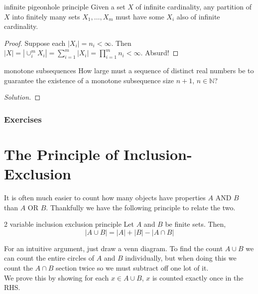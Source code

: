 \documentclass{article}
\newcounter{statementcount}
\begin{document}
\begin{theorem}[]{infinite pigeonhole principle}
    Given a set $X$ of infinite cardinality, any partition of $X$ into finitely many sets $X_1, \dots, X_m$ must have some $X_i$ also of infinite 
    cardinality. 
\end{theorem}

\begin{proof}
    Suppose each $|X_i| = n_i < \infty$. Then $|X| = |\cup_{i}^m X_i| = \sum_{i=1}^m |X_i| 
    = \prod_{i=1}^m n_i < \infty$. Absurd!
\end{proof}

\begin{problem}[]{monotone subsequences}
    How large must a sequence of distinct real numbers be to guarantee the existence of a monotone subsequence 
    size $n + 1$, $n \in \mathbb{N}$? 
\end{problem}

\begin{proof}[Solution]

\end{proof}

\subsubsection*{Exercises}

\newpage

\section{The Principle of Inclusion-Exclusion}

\setcounter{statementcount}{1}

It is often much easier to count how many objects have properties $A$ AND $B$ than $A$ OR $B$. Thankfully we have the following principle to 
relate the two.

\begin{proposition}[]{2 variable inclusion exclusion principle}
    Let $A$ and $B$ be finite sets. Then, 
    \[|A \cup B| = |A| + |B| - |A \cap B|\]    
\end{proposition}

For an intuitive argument, just draw a venn diagram. To find the count $A \cup B$ we can count the entire circles
of $A$ and $B$ individually, but when doing this we count the $A \cap B$ section twice so we must subtract off one 
lot of it. \\

We prove this by showing for each $x \in A \cup B$, $x$ is counted exactly once in the RHS. 
\end{document}
